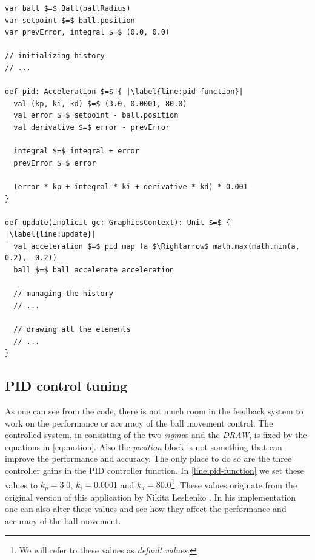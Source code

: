 \begin{minipage}{\linewidth}
\begin{lstlisting}[style=ScalaStyle, caption={Ball drawing}, label={lst:ball-feedback}]
var ball $=$ Ball(ballRadius)
var setpoint $=$ ball.position
var prevError, integral $=$ (0.0, 0.0)

// initializing history
// ...

def pid: Acceleration $=$ { |\label{line:pid-function}|
  val (kp, ki, kd) $=$ (3.0, 0.0001, 80.0)
  val error $=$ setpoint - ball.position
  val derivative $=$ error - prevError

  integral $=$ integral + error
  prevError $=$ error

  (error * kp + integral * ki + derivative * kd) * 0.001
}

def update(implicit gc: GraphicsContext): Unit $=$ { |\label{line:update}|
  val acceleration $=$ pid map (a $\Rightarrow$ math.max(math.min(a, 0.2), -0.2))
  ball $=$ ball accelerate acceleration

  // managing the history
  // ...

  // drawing all the elements
  // ...
}
\end{lstlisting}
\end{minipage}

\subsection*{PID control tuning}
As one can see from the code, there is not much room in the feedback system to work on the performance or accuracy of the ball movement control. The controlled system, in  consisting of the two \textit{sigma}s and the \textit{DRAW}, is fixed by the equations in \ref{eq:motion}. Also the \textit{position} block is not something that can improve the performance and accuracy. The only place to do so are the three controller gains in the PID controller function. In  \cref{line:pid-function} we set these values to $k_p = 3.0$, $k_i = 0.0001$ and $k_d = 80.0$\footnote{We will refer to these values as \textit{default values}.}. These values originate from the original version of this application by Nikita Leshenko \cite{nikital-balltracker}. In his implementation one can also alter these values and see how they affect the performance and accuracy of the ball movement.


